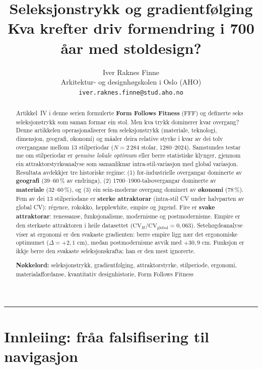 \documentclass[10pt, a4paper, twocolumn]{article}
\title{%
  \textbf{Seleksjonstrykk og gradientf\o lging}\\[0.4em]
  \large Kva krefter driv formendring i 700 \r{a}ar med stoldesign?%
}
\author{%
  Iver Raknes Finne\\
  \small Arkitektur- og designh\o gskolen i Oslo (AHO)\\
  \small \texttt{iver.raknes.finne@stud.aho.no}
}
\date{}
\begin{document}
\maketitle

\begin{abstract}
\noindent Artikkel~IV i denne serien formulerte \textbf{Form Follows Fitness} (FFF) og definerte seks seleksjonstrykk som saman formar ein stol. Men kva trykk dominerer kvar overgang? Denne artikkelen operasjonaliserer fem seleksjonstrykk (materiale, teknologi, dimensjon, geografi, \o konomi) og m\r{a}aler deira relative styrke i kvar av dei tolv overgangane mellom 13 stilperiodar ($N = 2\,284$ stolar, 1280--2024). Samstundes testar me om stilperiodar er \emph{genuine lokale optimum} eller berre statistiske klynger, gjennom ein attraktorstyrkeanalyse som samanliknar intra-stil-variasjon med global variasjon. Resultata avdekkjer tre historiske regime: (1) f\o r-industrielle overgangar dominerte av \textbf{geografi} (39--60\,\% av endringa), (2) 1700--1900-talsovergangar dominerte av \textbf{materiale} (32--60\,\%), og (3) ein sein-moderne overgang dominert av \textbf{\o konomi} (78\,\%). Fem av dei 13 stilperiodane er \textbf{sterke attraktorar} (intra-stil CV under halvparten av global CV): r\'{e}gence, rokokko, hepplewhite, empire og jugend. Fire er \textbf{svake attraktorar}: renessanse, funksjonalisme, modernisme og postmodernisme. Empire er den sterkaste attraktoren i heile datasettet ($\text{CV}_H / \text{CV}_{\text{global}} = 0{,}063$). Seteh\o gdeanalyse viser at ergonomi er den svakaste gradienten: berre empire ligg n\ae r det ergonomiske optimumet ($\Delta = +2{,}1$ cm), medan postmodernisme avvik med $+30{,}9$ cm. Funksjon er ikkje berre den svakaste seleksjonskrafta; han er den mest ignorerte.

\medskip
\noindent\textbf{N\o kkelord:} seleksjonstrykk, gradientf\o lging, attraktorstyrke, stilperiode, ergonomi, materialaffordanse, kvantitativ designhistorie, Form Follows Fitness
\end{abstract}

\vspace{1em}
\hrule
\vspace{1.5em}


\section{Innleiing: fr\r{a}a falsifisering til navigasjon}
\end{document}
